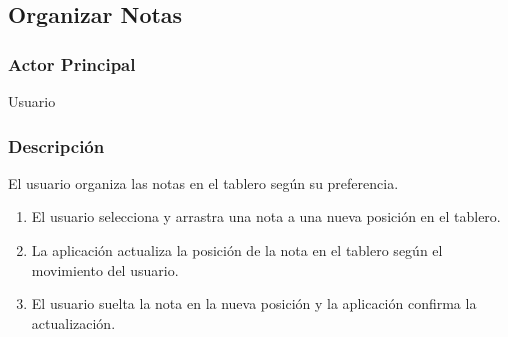\subsection{Organizar Notas}
\subsubsection{Actor Principal}
Usuario

\subsubsection{Descripción}
El usuario organiza las notas en el tablero según su preferencia.

\begin{enumerate}
  \item El usuario selecciona y arrastra una nota a una nueva posición en el tablero.
  \item La aplicación actualiza la posición de la nota en el tablero según el movimiento del usuario.
  \item El usuario suelta la nota en la nueva posición y la aplicación confirma la actualización.
\end{enumerate}
